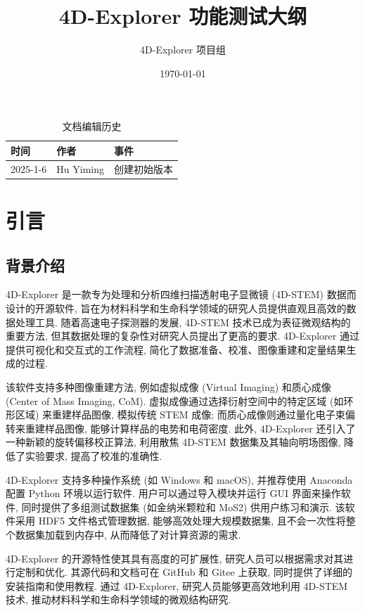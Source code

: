 \documentclass[a4paper,12pt]{report}	%
\title{4D-Explorer 功能测试大纲}
\author{4D-Explorer 项目组}
\date{\today}
\begin{document}
\maketitle
\tableofcontents 

\begin{table}[htbp]
\centering
\caption{文档编辑历史}
\begin{tabular}{lll}
\toprule
时间 & 作者 & 事件 \\
\midrule
2025-1-6 & Hu Yiming & 创建初始版本 \\
\bottomrule
\end{tabular}
\end{table}


\chapter{引言}

\section{背景介绍}

4D-Explorer 是一款专为处理和分析四维扫描透射电子显微镜 (4D-STEM) 数据而设计的开源软件, 旨在为材料科学和生命科学领域的研究人员提供直观且高效的数据处理工具. 随着高速电子探测器的发展, 4D-STEM 技术已成为表征微观结构的重要方法, 但其数据处理的复杂性对研究人员提出了更高的要求. 4D-Explorer 通过提供可视化和交互式的工作流程, 简化了数据准备、校准、图像重建和定量结果生成的过程.

该软件支持多种图像重建方法, 例如虚拟成像 (Virtual Imaging) 和质心成像 (Center of Mass Imaging, CoM). 虚拟成像通过选择衍射空间中的特定区域 (如环形区域) 来重建样品图像, 模拟传统 STEM 成像; 而质心成像则通过量化电子束偏转来重建样品图像, 能够计算样品的电势和电荷密度. 此外, 4D-Explorer 还引入了一种新颖的旋转偏移校正算法, 利用散焦 4D-STEM 数据集及其轴向明场图像, 降低了实验要求, 提高了校准的准确性.

4D-Explorer 支持多种操作系统 (如 Windows 和 macOS), 并推荐使用 Anaconda 配置 Python 环境以运行软件. 用户可以通过导入模块并运行 GUI 界面来操作软件, 同时提供了多组测试数据集 (如金纳米颗粒和 MoS2) 供用户练习和演示. 该软件采用 HDF5 文件格式管理数据, 能够高效处理大规模数据集, 且不会一次性将整个数据集加载到内存中, 从而降低了对计算资源的需求.

4D-Explorer 的开源特性使其具有高度的可扩展性, 研究人员可以根据需求对其进行定制和优化. 其源代码和文档可在 GitHub 和 Gitee 上获取, 同时提供了详细的安装指南和使用教程. 通过 4D-Explorer, 研究人员能够更高效地利用 4D-STEM 技术, 推动材料科学和生命科学领域的微观结构研究.
\end{document}

